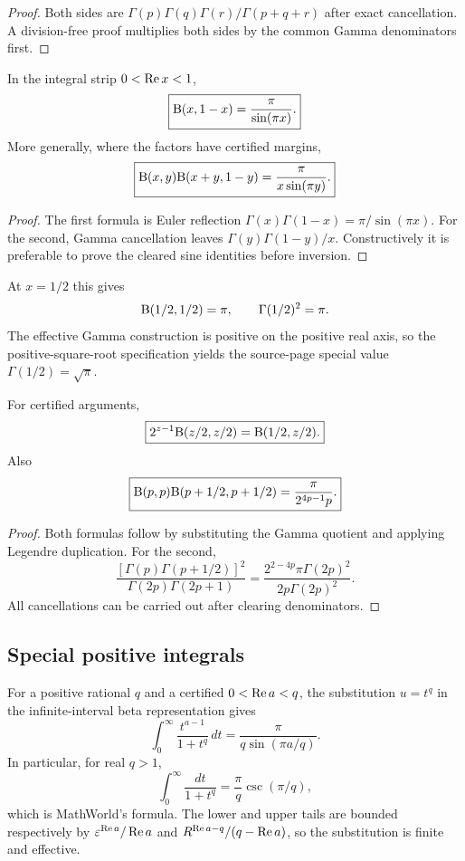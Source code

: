 \begin{proof}
Both sides are
$\Gamma(p)\Gamma(q)\Gamma(r)/\Gamma(p+q+r)$ after exact cancellation.  A division-free proof multiplies both sides by the common Gamma denominators first.
\end{proof}

\begin{corollary}\label{cor:beta-reflection}
In the integral strip $0<\operatorname{Re} x<1$,
\[
 \boxed{\mathrm B(x,1-x)=\frac{\pi}{\sin(\pi x)}.}
\]
More generally, where the factors have certified margins,
\[
 \boxed{\mathrm B(x,y)\mathrm B(x+y,1-y)=\frac{\pi}{x\sin(\pi y)}.}
\]
\end{corollary}

\begin{proof}
The first formula is Euler reflection
$\Gamma(x)\Gamma(1-x)=\pi/\sin(\pi x)$.  For the second, Gamma cancellation leaves
$\Gamma(y)\Gamma(1-y)/x$.  Constructively it is preferable to prove the cleared sine identities before inversion.
\end{proof}

At $x=1/2$ this gives
\[
 \mathrm B(1/2,1/2)=\pi,
 \qquad \Gamma(1/2)^2=\pi.
\]
The effective Gamma construction is positive on the positive real axis, so the
positive-square-root specification yields the source-page special value
$\Gamma(1/2)=\sqrt\pi$.

\begin{corollary}\label{cor:beta-duplication}
For certified arguments,
\[
 \boxed{2^{z-1}\mathrm B(z/2,z/2)=\mathrm B(1/2,z/2).}
\]
Also
\[
 \boxed{\mathrm B(p,p)\mathrm B(p+1/2,p+1/2)=
 \frac{\pi}{2^{4p-1}p}.}
\]
\end{corollary}

\begin{proof}
Both formulas follow by substituting the Gamma quotient and applying Legendre duplication.  For the second,
\[
 \frac{[\Gamma(p)\Gamma(p+1/2)]^2}
 {\Gamma(2p)\Gamma(2p+1)}
 =\frac{2^{2-4p}\pi\Gamma(2p)^2}
 {2p\Gamma(2p)^2}.
\]
All cancellations can be carried out after clearing denominators.
\end{proof}

\subsection{Special positive integrals}

For a positive rational $q$ and a certified $0<\operatorname{Re} a<q$, the substitution $u=t^q$ in the infinite-interval beta representation gives
\begin{equation}
 \boxed{
 \int_0^\infty\frac{t^{a-1}}{1+t^q}\,dt
 =\frac{\pi}{q\sin(\pi a/q)}.}
 \label{eq:p-integral}
\end{equation}
In particular, for real $q>1$,
\[
 \int_0^\infty\frac{dt}{1+t^q}
 =\frac{\pi}{q}\csc(\pi/q),
\]
which is MathWorld's formula.  The lower and upper tails are bounded respectively by $\varepsilon^{\operatorname{Re} a}/\operatorname{Re} a$ and $R^{\operatorname{Re} a-q}/(q-\operatorname{Re} a)$, so the substitution is finite and effective.
